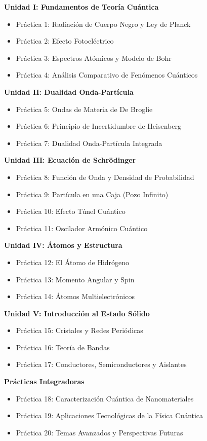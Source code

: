 \documentclass[12pt,a4paper]{book}
\begin{document}
	\textbf{Unidad I: Fundamentos de Teoría Cuántica}
	\begin{itemize}
		\item Práctica 1: Radiación de Cuerpo Negro y Ley de Planck
		\item Práctica 2: Efecto Fotoeléctrico
		\item Práctica 3: Espectros Atómicos y Modelo de Bohr
		\item Práctica 4: Análisis Comparativo de Fenómenos Cuánticos
	\end{itemize}
	
	\textbf{Unidad II: Dualidad Onda-Partícula}
	\begin{itemize}
		\item Práctica 5: Ondas de Materia de De Broglie
		\item Práctica 6: Principio de Incertidumbre de Heisenberg
		\item Práctica 7: Dualidad Onda-Partícula Integrada
	\end{itemize}
	
	\textbf{Unidad III: Ecuación de Schrödinger}
	\begin{itemize}
		\item Práctica 8: Función de Onda y Densidad de Probabilidad
		\item Práctica 9: Partícula en una Caja (Pozo Infinito)
		\item Práctica 10: Efecto Túnel Cuántico
		\item Práctica 11: Oscilador Armónico Cuántico
	\end{itemize}
	
	\textbf{Unidad IV: Átomos y Estructura}
	\begin{itemize}
		\item Práctica 12: El Átomo de Hidrógeno
		\item Práctica 13: Momento Angular y Spin
		\item Práctica 14: Átomos Multielectrónicos
	\end{itemize}
	
	\textbf{Unidad V: Introducción al Estado Sólido}
	\begin{itemize}
		\item Práctica 15: Cristales y Redes Periódicas
		\item Práctica 16: Teoría de Bandas
		\item Práctica 17: Conductores, Semiconductores y Aislantes
	\end{itemize}
	
	\textbf{Prácticas Integradoras}
	\begin{itemize}
		\item Práctica 18: Caracterización Cuántica de Nanomateriales
		\item Práctica 19: Aplicaciones Tecnológicas de la Física Cuántica
		\item Práctica 20: Temas Avanzados y Perspectivas Futuras
	\end{itemize}
	
\end{document}
